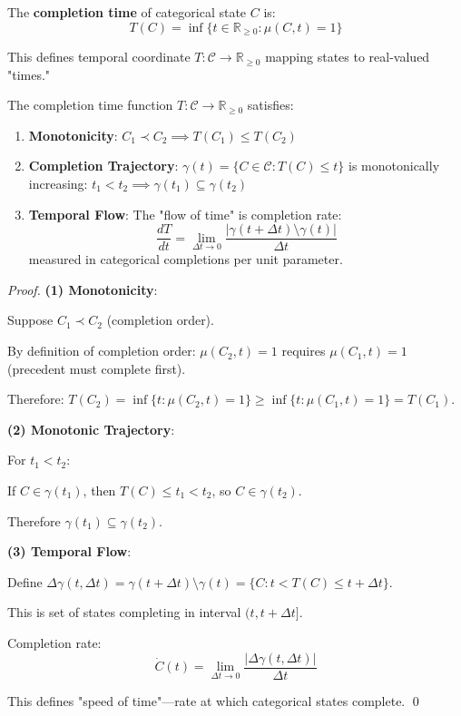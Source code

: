 \documentclass[11pt,onecolumn]{article}
\begin{document}
\begin{definition}
The \textbf{completion time} of categorical state $C$ is:
\begin{equation}
T(C) = \inf\{t \in \mathbb{R}_{\geq 0} : \mu(C, t) = 1\}
\end{equation}
\end{definition}

This defines temporal coordinate $T: \mathcal{C} \to \mathbb{R}_{\geq 0}$ mapping states to real-valued "times."

\begin{theorem}
\label{thm:temporal_emergence}
The completion time function $T: \mathcal{C} \to \mathbb{R}_{\geq 0}$ satisfies:
\begin{enumerate}
\item \textbf{Monotonicity}: $C_1 \prec C_2 \implies T(C_1) \leq T(C_2)$
\item \textbf{Completion Trajectory}: $\gamma(t) = \{C \in \mathcal{C} : T(C) \leq t\}$ is monotonically increasing: $t_1 < t_2 \implies \gamma(t_1) \subseteq \gamma(t_2)$
\item \textbf{Temporal Flow}: The "flow of time" is completion rate:
\begin{equation}
\frac{dT}{dt} = \lim_{\Delta t \to 0} \frac{|\gamma(t + \Delta t) \setminus \gamma(t)|}{\Delta t}
\end{equation}
measured in categorical completions per unit parameter.
\end{enumerate}
\end{theorem}

\begin{proof}
\textbf{(1) Monotonicity}:

Suppose $C_1 \prec C_2$ (completion order).

By definition of completion order: $\mu(C_2, t) = 1$ requires $\mu(C_1, t) = 1$ (precedent must complete first).

Therefore: $T(C_2) = \inf\{t : \mu(C_2,t)=1\} \geq \inf\{t : \mu(C_1,t)=1\} = T(C_1)$.

\textbf{(2) Monotonic Trajectory}:

For $t_1 < t_2$:

If $C \in \gamma(t_1)$, then $T(C) \leq t_1 < t_2$, so $C \in \gamma(t_2)$.

Therefore $\gamma(t_1) \subseteq \gamma(t_2)$.

\textbf{(3) Temporal Flow}:

Define $\Delta \gamma(t, \Delta t) = \gamma(t + \Delta t) \setminus \gamma(t) = \{C : t < T(C) \leq t + \Delta t\}$.

This is set of states completing in interval $(t, t+\Delta t]$.

Completion rate:
\begin{equation}
\dot{C}(t) = \lim_{\Delta t \to 0} \frac{|\Delta \gamma(t, \Delta t)|}{\Delta t}
\end{equation}

This defines "speed of time"---rate at which categorical states complete. \qed
\end{proof}
\end{document}
